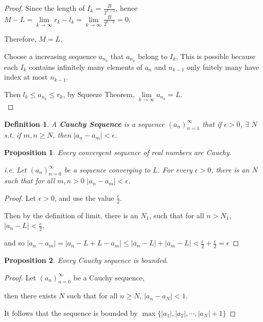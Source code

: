 \documentclass[12pt]{article}
\newcommand{\abs}[1]{\left| #1 \right|}
\theoremstyle{plain}
\newtheorem{definition}{Definition}[subsection]
\newtheorem{proposition}{Proposition}[subsection]
\newcommand{\dlim}{\displaystyle\lim\limits}
\begin{document}
{\begin{proof}
        Since the length of $I_k$ = $\frac B{2^{k-2}}$, 
        hence $M-L=\dlim_{k\to\infty} r_k-l_k = 
        \dlim_{k\to\infty} \frac{B}{2^{k-2}} = 0$.

        Therefore, $M=L$.

        Choose a increasing sequence $a_{n_k}$ that $a_{n_k}$ belong to $I_k$,
        This is possible because each $I_k$ contains infinitely many elements of $a_n$
        and $n_{k-1}$ only fnitely many have index at most $n_{k-1}$. 

        Then $l_k\leq a_{n_k}\leq r_k$, by Squeeze Theorem, 
        $\dlim_{k\to\infty}a_{n_k} = L$.\\
    \end{proof}}


    \begin{definition}
        A \textbf{Cauchy Sequence} is a sequence $(a_n)_{n=1}^\infty$ that
        if $\epsilon > 0$, $\exists \,\, N$ s.t. if $m, n \geq N$, 
        then $\abs{a_n - a_m} < \epsilon$.\\
    \end{definition}

    \begin{proposition}
        Every convergent sequence of real numbers are Cauchy.

        i.e. Let $(a_n)^{\infty}_{n=0}$ be a sequence converging to $L$.
        For every $\epsilon>0$, there is an $N$ such that for all $m, n>0$
        $\abs{a_n-a_m}<\epsilon$.
    \end{proposition}
    \begin{proof}
        Let $\epsilon>0$, and use the value $\frac{\epsilon}2$. 
        
        Then by the definition of limit, there is an $N_1$, such that for all
        $n>N_1$, $\abs{a_n-L}<\frac{\epsilon}2$, 
        
        and so $\abs{a_n-a_m}=\abs{a_n-L+L-a_m}
        \leq \abs{a_n-L}+\abs{a_m-L}<\frac{\epsilon}2+\frac{\epsilon}2=\epsilon$ 

    \end{proof}

    \begin{proposition}
        Every Cauchy sequence is bounded.
    \end{proposition}
    \begin{proof}
        Let $(a_n)^{\infty}_{n=0}$ be a Cauchy sequence, 
        
        then there exists $N$ such that 
        for all $n\geq N$, $\abs{a_n-a_N}<1$.

        It follows that the sequence is bounded by $\max\{\abs{a_1}, \abs{a_2},\cdots, \abs{a_N}+1\}$
    \end{proof}
\end{document}
